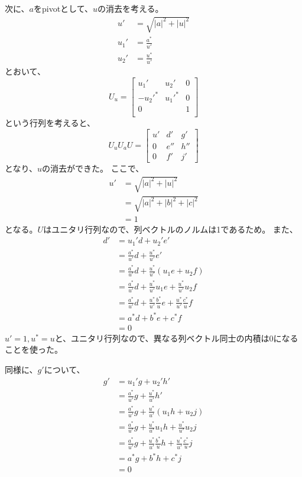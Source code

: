 次に、$a$をpivotとして、$u$の消去を考える。
\begin{align}
  u'   &= \sqrt{|a|^2 + |u|^2} \\
  u_1' &= \frac{a^*}{u'}\\
  u_2' &= \frac{u^*}{u'}
\end{align}
とおいて、
\begin{equation}
  U_u =
  \begin{bmatrix}
    u_1'    & u_2'   & 0 \\
    -u_2'^* & u_1'^* & 0 \\
    0       &        & 1 \\
  \end{bmatrix}
\end{equation}
という行列を考えると、
\begin{equation}
  U_u U_a U =
  \begin{bmatrix}
    u' & d'  & g'  \\
    0  & e'' & h'' \\
    0  & f'  & j'
  \end{bmatrix}
\end{equation}
となり、$u$の消去ができた。
ここで、
\begin{align}
  u' &= \sqrt{|a|^2 + |u|^2} \\
     &= \sqrt{|a|^2 + |b|^2 + |c|^2} \\
     &= 1
\end{align}
となる。$U$はユニタリ行列なので、列ベクトルのノルムは1であるため。
また、
\begin{align}
  d' &= u_1'd + u_2'e' \\
     &= \frac{a^*}{u'}d + \frac{u^*}{u'}e' \\
     &= \frac{a^*}{u'}d + \frac{u^*}{u'}(u_1 e + u_2 f) \\
     &= \frac{a^*}{u'}d + \frac{u^*}{u'}u_1 e + \frac{u^*}{u'}u_2 f \\
     &= \frac{a^*}{u'}d + \frac{u^*}{u'}\frac{b^*}{u}e + \frac{u^*}{u'}\frac{c^*}{u}f \\
     &= a^*d + b^*e + c^*f \\
     &= 0
\end{align}
$u'=1,u^*=u$と、ユニタリ行列なので、異なる列ベクトル同士の内積は$0$になることを使った。

同様に、$g'$について、
\begin{align}
  g' &= u_1'g + u_2'h' \\
     &= \frac{a^*}{u'}g + \frac{u^*}{u'}h' \\
     &= \frac{a^*}{u'}g + \frac{u^*}{u'}(u_1 h + u_2 j) \\
     &= \frac{a^*}{u'}g + \frac{u^*}{u'}u_1 h + \frac{u^*}{u'}u_2 j \\
     &= \frac{a^*}{u'}g + \frac{u^*}{u'}\frac{b^*}{u}h + \frac{u^*}{u'}\frac{c^*}{u}j \\
     &= a^*g + b^*h + c^*j \\
     &= 0
\end{align}

